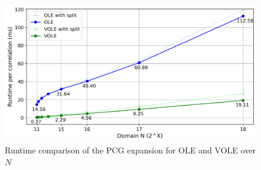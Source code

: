\begin{figure}[t]
    \centering
    \includegraphics[scale=0.49]{images/plots/pcg_eval.png}
    \caption{Runtime comparison of the PCG expansion for OLE and VOLE over $N$}
    \label{fig:ComparingPCGExpansion}
\end{figure}


